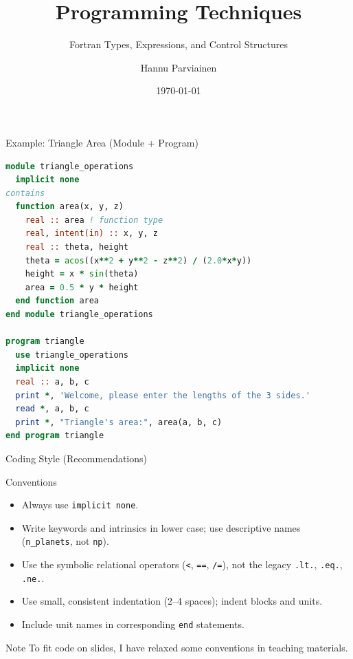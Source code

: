 

\title{Programming Techniques}
\subtitle{Fortran Types, Expressions, and Control Structures}
\author{Hannu Parviainen}
\date{\today}



\begin{frame}
  \titlepage
\end{frame}

\begin{frame}[fragile]{Example: Triangle Area (Module + Program)}
\begin{lstlisting}[language=Fortran]
module triangle_operations
  implicit none
contains
  function area(x, y, z)
    real :: area ! function type
    real, intent(in) :: x, y, z
    real :: theta, height
    theta = acos((x**2 + y**2 - z**2) / (2.0*x*y))
    height = x * sin(theta)
    area = 0.5 * y * height
  end function area
end module triangle_operations

program triangle
  use triangle_operations
  implicit none
  real :: a, b, c
  print *, 'Welcome, please enter the lengths of the 3 sides.'
  read *, a, b, c
  print *, "Triangle's area:", area(a, b, c)
end program triangle
\end{lstlisting}
\end{frame}


\begin{frame}{Coding Style (Recommendations)}
\begin{block}{Conventions}
\begin{itemize}
\item Always use \texttt{implicit none}.
\item Write keywords and intrinsics in lower case; use descriptive names (\texttt{n\_planets}, not \texttt{np}).
\item Use the symbolic relational operators (\texttt{<}, \texttt{==}, \texttt{/=}), not the legacy \texttt{.lt.}, \texttt{.eq.}, \texttt{.ne.}.
\item Use small, consistent indentation (2–4 spaces); indent blocks and units.
\item Include unit names in corresponding \texttt{end} statements.
\end{itemize}
\end{block}
\begin{block}{Note}
To fit code on slides, I have relaxed some conventions in teaching materials.
\end{block}
\end{frame}


